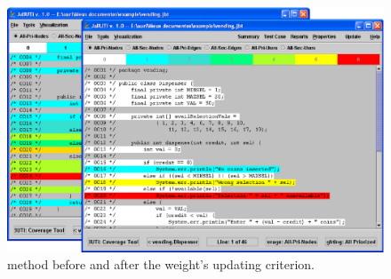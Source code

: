 \begin{figure}[!ht]
\begin{center}
\includegraphics[height=0.40\textheight]{fig/dispenser-source-edited}
\caption{\label{fig:source-input1} 
method before and after the weight's updating \wrt
{} criterion.}
\end{center}
\end{figure}

